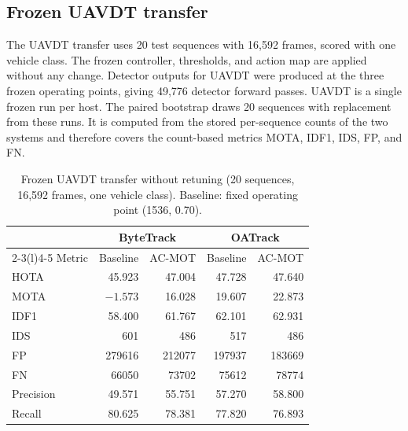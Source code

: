 \documentclass[pdflatex,sn-mathphys-num,iicol]{sn-jnl}
\begin{document}
\subsection{Frozen UAVDT transfer}
The UAVDT transfer uses 20 test sequences with 16,592 frames, scored with one
vehicle class. The frozen controller, thresholds, and action map are applied
without any change. Detector outputs for UAVDT were produced at the three
frozen operating points, giving 49,776 detector forward passes. UAVDT is a
single frozen run per host. The paired bootstrap draws 20 sequences with
replacement from these runs. It is computed from the stored per-sequence
counts of the two systems and therefore covers the count-based metrics MOTA,
IDF1, IDS, FP, and FN.

\begin{table}[t]
\caption{Frozen UAVDT transfer without retuning (20 sequences, 16,592 frames,
one vehicle class). Baseline: fixed operating point (1536, 0.70).}
\label{tab:uavdt}
\centering\footnotesize
\setlength{\tabcolsep}{4pt}
\begin{tabular}{@{}lrrrr@{}}
\toprule
 & \multicolumn{2}{c}{ByteTrack} & \multicolumn{2}{c}{OATrack}\\
\cmidrule(lr){2-3}\cmidrule(l){4-5}
Metric & Baseline & AC-MOT & Baseline & AC-MOT\\
\midrule
HOTA & 45.923 & 47.004 & 47.728 & 47.640\\
MOTA & $-1.573$ & 16.028 & 19.607 & 22.873\\
IDF1 & 58.400 & 61.767 & 62.101 & 62.931\\
IDS & 601 & 486 & 517 & 486\\
FP & 279616 & 212077 & 197937 & 183669\\
FN & 66050 & 73702 & 75612 & 78774\\
Precision & 49.571 & 55.751 & 57.270 & 58.800\\
Recall & 80.625 & 78.381 & 77.820 & 76.893\\
\bottomrule
\end{tabular}
\end{table}
\end{document}

